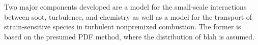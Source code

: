 

Two major components developed are a model for the small-scale interactions between soot, turbulence, and chemistry as well as a model for the transport of strain-sensitive species in turbulent nonpremixed combustion. The former is based on the presumed PDF method, where the distribution of blah is assumed.






